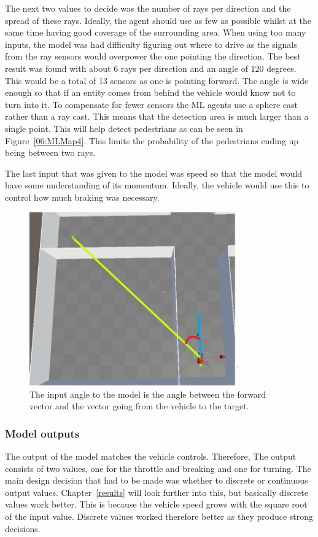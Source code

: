 The next two values to decide was the number of rays per direction and the spread of these rays. Ideally, the agent should use as few as possible whilst at the same time having good coverage of the surrounding area. When using too many inputs, the model was had difficulty figuring out where to drive as the signals from the ray sensors would overpower the one pointing the direction. The best result was found with about 6 rays per direction and an angle of 120 degrees. This would be a total of 13 sensors as one is pointing forward. The angle is wide enough so that if an entity comes from behind the vehicle would know not to turn into it. To compensate for fewer sensors the ML agents use a sphere cast rather than a ray cast. This means that the detection area is much larger than a single point. This will help detect pedestrians as can be seen in Figure~\ref{06:MLMap4}. This limits the probability of the pedestrians ending up being between two rays.  

The last input that was given to the model was speed so that the model would have some understanding of its momentum. Ideally, the vehicle would use this to control how much braking was necessary. 

\begin{figure}[h]
    \centering
    \includegraphics[width=0.8\textwidth]{06_Implementation/00_MLAgents/Images/angle.jpg}
    \caption[Angle visualisation]{The input angle to the model is the angle between the forward vector and the vector going from the vehicle to the target.} \label{06:angleDrawing}
\end{figure}

\subsubsection{Model outputs}
The output of the model matches the vehicle controls. Therefore, The output consists of two values, one for the throttle and breaking and one for turning. The main design decision that had to be made was whether to discrete or continuous output values. Chapter~\ref{results} will look further into this, but basically discrete values work better. This is because the vehicle speed grows with the square root of the input value. Discrete values worked therefore better as they produce strong decisions. 


